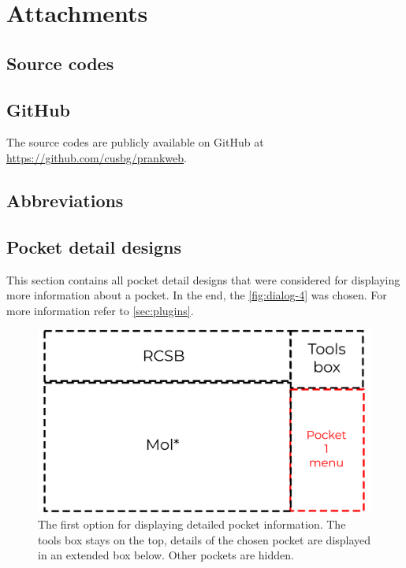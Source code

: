 \chapter{Attachments}

\section{Source codes}
\label{sec:source_codes}

\section{GitHub}
\label{sec:github}

The source codes are publicly available on GitHub at \url{https://github.com/cusbg/prankweb}.

\section{Abbreviations}
\label{sec:abbreviations}


\section{Pocket detail designs}
\label{sec:pocket_detail_designs}

This section contains all pocket detail designs that were considered for displaying more information about a pocket. In the end, the \cref{fig:dialog-4} was chosen. For more information refer to \cref{sec:plugins}.

\begin{figure}[htb]
    \centering
    \includegraphics[width=\linewidth]{img/dialog_1-svg.pdf}
    \caption{The first option for displaying detailed pocket information. The tools box stays on the top, details of the chosen pocket are displayed in an extended box below. Other pockets are hidden.}
    \label{fig:dialog-1}
\end{figure}

